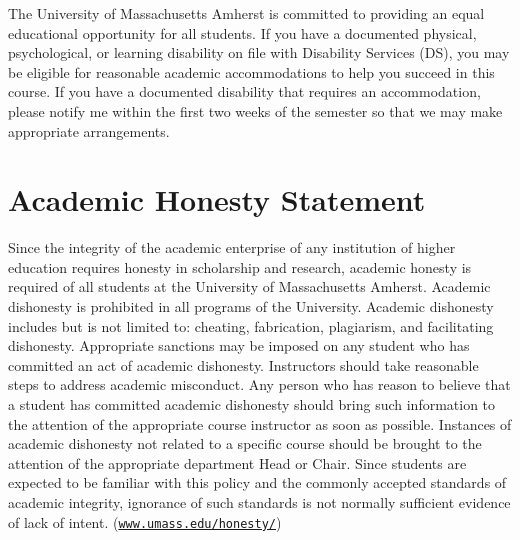 \documentclass[11pt,letterpaper]{article}
\begin{document}
The University of Massachusetts Amherst is committed to providing an equal educational opportunity for all students.  If you have a documented physical, psychological, or learning disability on file with Disability Services (DS), you may be eligible for reasonable academic accommodations to help you succeed in this course.  If you have a documented disability that requires an accommodation, please notify me within the first two weeks of the semester so that we may make appropriate arrangements.

\section*{Academic Honesty Statement}

Since the integrity of the academic enterprise of any institution of higher education requires honesty in scholarship and research, academic honesty is required of all students at the University of Massachusetts Amherst. Academic dishonesty is prohibited in all programs of the University. Academic dishonesty includes but is not limited to: cheating, fabrication, plagiarism, and facilitating dishonesty. Appropriate sanctions may be imposed on any student who has committed an act of academic dishonesty. Instructors should take reasonable steps to address academic misconduct. Any person who has reason to believe that a student has committed academic dishonesty should bring such information to the attention of the appropriate course instructor as soon as possible. Instances of academic dishonesty not related to a specific course should be brought to the attention of the appropriate department Head or Chair. Since students are expected to be familiar with this policy and the commonly accepted standards of
academic integrity, ignorance of such standards is not normally sufficient evidence of lack of intent. (\href{https://www.umass.edu/honesty/}{\texttt{www.umass.edu/honesty/}})
\end{document}
